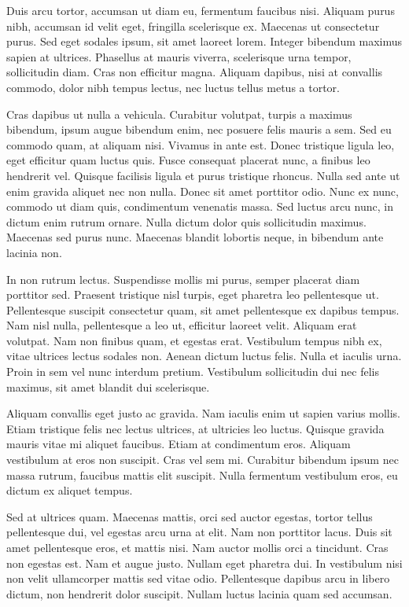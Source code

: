 \documentclass[a4paper, 12pt]{article}
\begin{document}
	Duis arcu tortor, accumsan ut diam eu, fermentum faucibus nisi. Aliquam purus nibh, accumsan id velit eget, fringilla scelerisque ex. Maecenas ut consectetur purus. Sed eget sodales ipsum, sit amet laoreet lorem. Integer bibendum maximus sapien at ultrices. Phasellus at mauris viverra, scelerisque urna tempor, sollicitudin diam. Cras non efficitur magna. Aliquam dapibus, nisi at convallis commodo, dolor nibh tempus lectus, nec luctus tellus metus a tortor.
	
	Cras dapibus ut nulla a vehicula. Curabitur volutpat, turpis a maximus bibendum, ipsum augue bibendum enim, nec posuere felis mauris a sem. Sed eu commodo quam, at aliquam nisi. Vivamus in ante est. Donec tristique ligula leo, eget efficitur quam luctus quis. Fusce consequat placerat nunc, a finibus leo hendrerit vel. Quisque facilisis ligula et purus tristique rhoncus. Nulla sed ante ut enim gravida aliquet nec non nulla. Donec sit amet porttitor odio. Nunc ex nunc, commodo ut diam quis, condimentum venenatis massa. Sed luctus arcu nunc, in dictum enim rutrum ornare. Nulla dictum dolor quis sollicitudin maximus. Maecenas sed purus nunc. Maecenas blandit lobortis neque, in bibendum ante lacinia non.
	
	In non rutrum lectus. Suspendisse mollis mi purus, semper placerat diam porttitor sed. Praesent tristique nisl turpis, eget pharetra leo pellentesque ut. Pellentesque suscipit consectetur quam, sit amet pellentesque ex dapibus tempus. Nam nisl nulla, pellentesque a leo ut, efficitur laoreet velit. Aliquam erat volutpat. Nam non finibus quam, et egestas erat. Vestibulum tempus nibh ex, vitae ultrices lectus sodales non. Aenean dictum luctus felis. Nulla et iaculis urna. Proin in sem vel nunc interdum pretium. Vestibulum sollicitudin dui nec felis maximus, sit amet blandit dui scelerisque.
	
	Aliquam convallis eget justo ac gravida. Nam iaculis enim ut sapien varius mollis. Etiam tristique felis nec lectus ultrices, at ultricies leo luctus. Quisque gravida mauris vitae mi aliquet faucibus. Etiam at condimentum eros. Aliquam vestibulum at eros non suscipit. Cras vel sem mi. Curabitur bibendum ipsum nec massa rutrum, faucibus mattis elit suscipit. Nulla fermentum vestibulum eros, eu dictum ex aliquet tempus.
	
	Sed at ultrices quam. Maecenas mattis, orci sed auctor egestas, tortor tellus pellentesque dui, vel egestas arcu urna at elit. Nam non porttitor lacus. Duis sit amet pellentesque eros, et mattis nisi. Nam auctor mollis orci a tincidunt. Cras non egestas est. Nam et augue justo. Nullam eget pharetra dui. In vestibulum nisi non velit ullamcorper mattis sed vitae odio. Pellentesque dapibus arcu in libero dictum, non hendrerit dolor suscipit. Nullam luctus lacinia quam sed accumsan.
	
\end{document}
